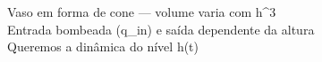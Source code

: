 \documentclass[preview]{standalone}
\begin{document}
Vaso em forma de cone — volume varia com h^3\\Entrada bombeada (q_in) e saída dependente da altura\\Queremos a dinâmica do nível h(t)\\
\end{document}
